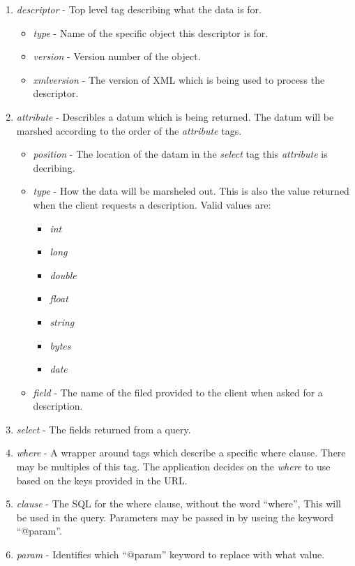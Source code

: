\begin{enumerate}
\item \emph{descriptor} - Top level tag describing what the data is for.
\begin{itemize}
\item \emph{type} - Name of the specific object this descriptor is for.
\item \emph{version} - Version number of the object.
\item \emph{xmlversion} - The version of XML which is being used to process the descriptor.
\end{itemize}
\item \emph{attribute} - Describles a datum which is being returned. The datum will be marshed 
according to the order of the \emph{attribute} tags.
\begin{itemize}
\item \emph{position} - The location of the datam in the \emph{select} tag this \emph{attribute}
is decribing.
\item \emph{type} - How the data will be marsheled out.  This is also the value returned when 
the client requests a description.  Valid values are:
\begin{itemize}
\item \emph{int}
\item \emph{long}
\item \emph{double}
\item \emph{float}
\item \emph{string}
\item \emph{bytes}
\item \emph{date}
\end{itemize}
\item \emph{field} - The name of the filed provided to the client when asked for a description.
\end{itemize}
\item \emph{select} - The fields returned from a query.
\item \emph{where} - A wrapper around tags which describe a specific where clause.  There may be 
multiples of this  tag.  The application decides on the \emph{where} to use based on the keys 
provided in the URL.
\item \emph{clause} - The SQL for the where clause, without the word ``where'', This will be used 
in the query.  Parameters may be passed in by useing the keyword ``@param''.  
\item \emph{param} - Identifies which ``@param'' keyword to replace with what value.

\end{enumerate}
